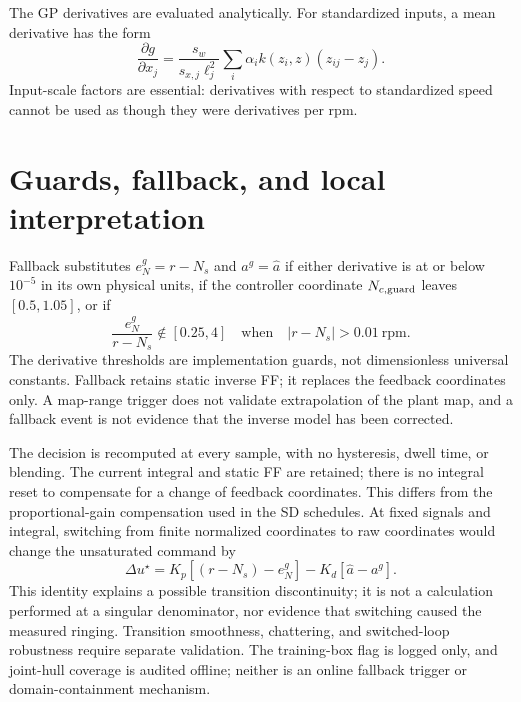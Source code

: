 The GP derivatives are evaluated analytically. For standardized inputs, a mean derivative has the form
\begin{equation}
\frac{\partial g}{\partial x_j}
=\frac{s_w}{s_{x,j}\ell_j^2}\sum_i\alpha_i k(z_i,z)(z_{ij}-z_j).
\end{equation}
Input-scale factors are essential: derivatives with respect to standardized speed cannot be used as though they were derivatives per rpm.


\section{Guards, fallback, and local interpretation}
Fallback substitutes $e_N^g=r-N_s$ and $a^g=\hat a$ if either derivative is at or below $10^{-5}$ in its own physical units, if the controller coordinate $N_{c,\rm guard}$ leaves $[0.5,1.05]$, or if
\begin{equation}
\frac{e_N^g}{r-N_s}\notin[0.25,4]\quad\text{when}\quad|r-N_s|>0.01\ \mathrm{rpm}.
\end{equation}
The derivative thresholds are implementation guards, not dimensionless universal constants. Fallback retains static inverse FF; it replaces the feedback coordinates only. A map-range trigger does not validate extrapolation of the plant map, and a fallback event is not evidence that the inverse model has been corrected.

The decision is recomputed at every sample, with no hysteresis, dwell time, or blending. The current integral and static FF are retained; there is no integral reset to compensate for a change of feedback coordinates. This differs from the proportional-gain compensation used in the SD schedules. At fixed signals and integral, switching from finite normalized coordinates to raw coordinates would change the unsaturated command by
\begin{equation}
\Delta u^\star=K_p[(r-N_s)-e_N^g]-K_d[\hat a-a^g].
\end{equation}
This identity explains a possible transition discontinuity; it is not a calculation performed at a singular denominator, nor evidence that switching caused the measured ringing. Transition smoothness, chattering, and switched-loop robustness require separate validation. The training-box flag is logged only, and joint-hull coverage is audited offline; neither is an online fallback trigger or domain-containment mechanism.

